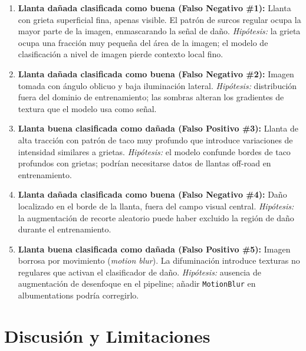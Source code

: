 \documentclass{article}
\begin{document}
\begin{enumerate}
  \item \textbf{Llanta dañada clasificada como buena (Falso Negativo \#1):} 
        Llanta con grieta superficial fina, apenas visible. El patrón de surcos 
        regular ocupa la mayor parte de la imagen, enmascarando la señal de daño. 
        \textit{Hipótesis:} la grieta ocupa una fracción muy pequeña del área de la 
        imagen; el modelo de clasificación a nivel de imagen pierde contexto local fino.

  \item \textbf{Llanta dañada clasificada como buena (Falso Negativo \#2):} 
        Imagen tomada con ángulo oblicuo y baja iluminación lateral. 
        \textit{Hipótesis:} distribución fuera del dominio de entrenamiento; las 
        sombras alteran los gradientes de textura que el modelo usa como señal.

  \item \textbf{Llanta buena clasificada como dañada (Falso Positivo \#3):} 
        Llanta de alta tracción con patrón de taco muy profundo que introduce 
        variaciones de intensidad similares a grietas. 
        \textit{Hipótesis:} el modelo confunde bordes de taco profundos con 
        grietas; podrían necesitarse datos de llantas off-road en entrenamiento.

  \item \textbf{Llanta dañada clasificada como buena (Falso Negativo \#4):} 
        Daño localizado en el borde de la llanta, fuera del campo visual central. 
        \textit{Hipótesis:} la augmentación de recorte aleatorio puede haber 
        excluido la región de daño durante el entrenamiento.

  \item \textbf{Llanta buena clasificada como dañada (Falso Positivo \#5):} 
        Imagen borrosa por movimiento (\emph{motion blur}). La difuminación 
        introduce texturas no regulares que activan el clasificador de daño. 
        \textit{Hipótesis:} ausencia de augmentación de desenfoque en el pipeline; 
        añadir \texttt{MotionBlur} en albumentations podría corregirlo.
\end{enumerate}

\section{Discusión y Limitaciones}
\label{sec:discussion}
\end{document}
